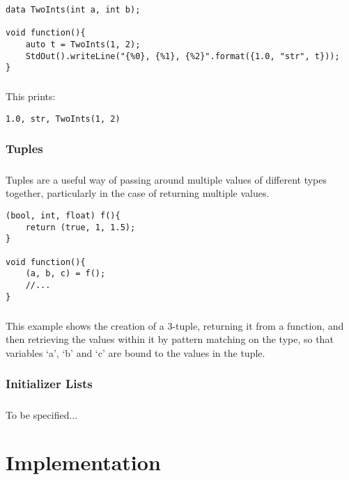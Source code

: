 \documentclass[12pt,twoside,notitlepage]{report}
\begin{document}
\begin{lstlisting}
data TwoInts(int a, int b);

void function(){
	auto t = TwoInts(1, 2);
	StdOut().writeLine("{%0}, {%1}, {%2}".format({1.0, "str", t}));
}
\end{lstlisting}

\paragraph{}
This prints:

\begin{verbatim}
1.0, str, TwoInts(1, 2)
\end{verbatim}

\subsection{Tuples}

\paragraph{}
Tuples are a useful way of passing around multiple values of different types together, particularly in the case of returning multiple values.

\begin{lstlisting}
(bool, int, float) f(){
	return (true, 1, 1.5);
}

void function(){
	(a, b, c) = f();
	//...
}
\end{lstlisting}

\paragraph{}
This example shows the creation of a 3-tuple, returning it from a function, and then retrieving the values within it by pattern matching on the type, so that variables `a', `b' and `c' are bound to the values in the tuple.

\subsection{Initializer Lists}

\paragraph{}
To be specified...

\cleardoublepage

\chapter{Implementation}
\end{document}
